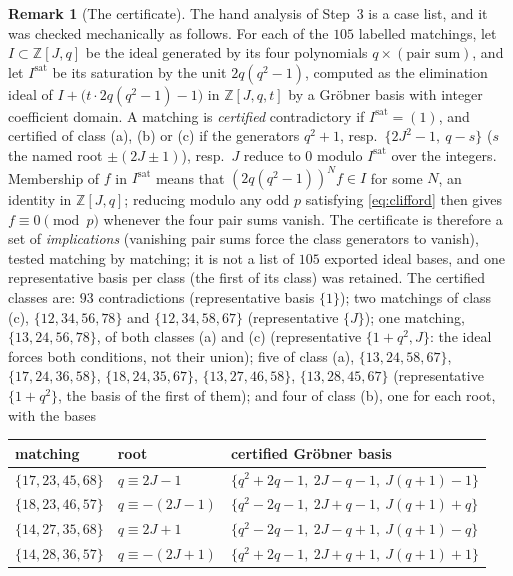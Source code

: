 \documentclass[11pt]{article}
\theoremstyle{definition}
\newtheorem{remark}[theorem]{Remark}
\newcommand{\Z}{\mathbb Z}
\begin{document}
\begin{remark}[The certificate]
\label{rem:certificate}
The hand analysis of Step~3 is a case list, and it was checked
mechanically as follows.  For each of the $105$ labelled matchings, let
$I\subset\Z[J,q]$ be the ideal generated by its four polynomials
$q\times(\text{pair sum})$, and let $I^{\mathrm{sat}}$ be its saturation by
the unit $2q(q^2-1)$, computed as the elimination ideal of
$I+\bigl(t\cdot2q(q^2-1)-1\bigr)$ in $\Z[J,q,t]$ by a Gr\"obner basis with
integer coefficient domain.  A matching is \emph{certified} contradictory
if $I^{\mathrm{sat}}=(1)$, and certified of class (a), (b) or (c) if the
generators $q^2+1$, resp.\ $\{2J^2-1,\ q-s\}$ ($s$ the named root
$\pm(2J\pm1)$), resp.\ $J$ reduce to $0$ modulo $I^{\mathrm{sat}}$ over the
integers.  Membership of $f$ in $I^{\mathrm{sat}}$ means that
$(2q(q^2-1))^Nf\in I$ for some $N$, an identity in $\Z[J,q]$; reducing
modulo any odd $p$ satisfying \eqref{eq:clifford} then gives
$f\equiv0\pmod p$ whenever the four pair sums vanish.  The certificate
is therefore a set of \emph{implications} (vanishing pair sums force the
class generators to vanish), tested matching by matching; it is not a
list of $105$ exported ideal bases, and one representative basis per
class (the first of its class) was retained.  The certified classes
are: $93$ contradictions (representative basis $\{1\}$); two matchings
of class (c), $\{12,34,56,78\}$ and $\{12,34,58,67\}$ (representative
$\{J\}$); one matching, $\{13,24,56,78\}$, of both classes (a) and (c)
(representative $\{1+q^2,J\}$: the ideal forces both conditions, not
their union); five of class (a), $\{13,24,58,67\}$, $\{17,24,36,58\}$,
$\{18,24,35,67\}$, $\{13,27,46,58\}$, $\{13,28,45,67\}$ (representative
$\{1+q^2\}$, the basis of the first of them); and four of class (b), one
for each root, with the bases
\begin{center}
\begin{tabular}{@{}lll@{}}
\toprule
matching & root & certified Gr\"obner basis\\
\midrule
$\{17,23,45,68\}$ & $q\equiv2J-1$ & $\{q^2+2q-1,\ 2J-q-1,\ J(q+1)-1\}$\\
$\{18,23,46,57\}$ & $q\equiv-(2J-1)$ & $\{q^2-2q-1,\ 2J+q-1,\ J(q+1)+q\}$\\
$\{14,27,35,68\}$ & $q\equiv2J+1$ & $\{q^2-2q-1,\ 2J-q+1,\ J(q+1)-q\}$\\
$\{14,28,36,57\}$ & $q\equiv-(2J+1)$ & $\{q^2+2q-1,\ 2J+q+1,\ J(q+1)+1\}$\\
\bottomrule
\end{tabular}

\end{center}
\end{remark}
\end{document}
